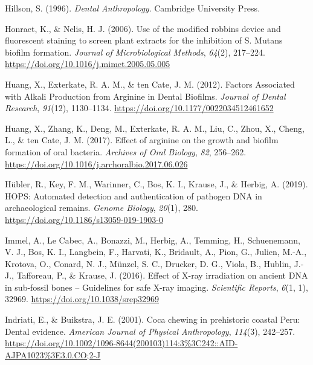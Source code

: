 \documentclass[
  letterpaper,
]{book}
\newlength{\cslhangindent}
\newlength{\cslentryspacingunit} %
\newenvironment{CSLReferences}[2] %
 {%
  \setlength{\parindent}{0pt}
  \ifodd #1
  \let\oldpar\par
  \def\par{\hangindent=\cslhangindent\oldpar}
  \fi
  \setlength{\parskip}{#2\cslentryspacingunit}
 }%
 {}
\begin{document}
\begin{CSLReferences}{1}{0}
\leavevmode{}%
Hillson, S. (1996). \emph{Dental {Anthropology}}. {Cambridge University
Press}.

\leavevmode{}%
Honraet, K., \& Nelis, H. J. (2006). Use of the modified robbins device
and fluorescent staining to screen plant extracts for the inhibition of
{S}. Mutans biofilm formation. \emph{Journal of Microbiological
Methods}, \emph{64}(2), 217--224.
\url{https://doi.org/10.1016/j.mimet.2005.05.005}

\leavevmode{}%
Huang, X., Exterkate, R. A. M., \& ten Cate, J. M. (2012). Factors
{Associated} with {Alkali Production} from {Arginine} in {Dental
Biofilms}. \emph{Journal of Dental Research}, \emph{91}(12), 1130--1134.
\url{https://doi.org/10.1177/0022034512461652}

\leavevmode{}%
Huang, X., Zhang, K., Deng, M., Exterkate, R. A. M., Liu, C., Zhou, X.,
Cheng, L., \& ten Cate, J. M. (2017). Effect of arginine on the growth
and biofilm formation of oral bacteria. \emph{Archives of Oral Biology},
\emph{82}, 256--262.
\url{https://doi.org/10.1016/j.archoralbio.2017.06.026}

\leavevmode{}%
Hübler, R., Key, F. M., Warinner, C., Bos, K. I., Krause, J., \& Herbig,
A. (2019). {HOPS}: Automated detection and authentication of pathogen
{DNA} in archaeological remains. \emph{Genome Biology}, \emph{20}(1),
280. \url{https://doi.org/10.1186/s13059-019-1903-0}

\leavevmode{}%
Immel, A., Le Cabec, A., Bonazzi, M., Herbig, A., Temming, H.,
Schuenemann, V. J., Bos, K. I., Langbein, F., Harvati, K., Bridault, A.,
Pion, G., Julien, M.-A., Krotova, O., Conard, N. J., Münzel, S. C.,
Drucker, D. G., Viola, B., Hublin, J.-J., Tafforeau, P., \& Krause, J.
(2016). Effect of {X-ray} irradiation on ancient {DNA} in sub-fossil
bones -- {Guidelines} for safe {X-ray} imaging. \emph{Scientific
Reports}, \emph{6}(1, 1), 32969. \url{https://doi.org/10.1038/srep32969}

\leavevmode{}%
Indriati, E., \& Buikstra, J. E. (2001). Coca chewing in prehistoric
coastal {Peru}: {Dental} evidence. \emph{American Journal of Physical
Anthropology}, \emph{114}(3), 242--257.
\url{https://doi.org/10.1002/1096-8644(200103)114:3\%3C242::AID-AJPA1023\%3E3.0.CO;2-J}


\end{CSLReferences}
\end{document}
